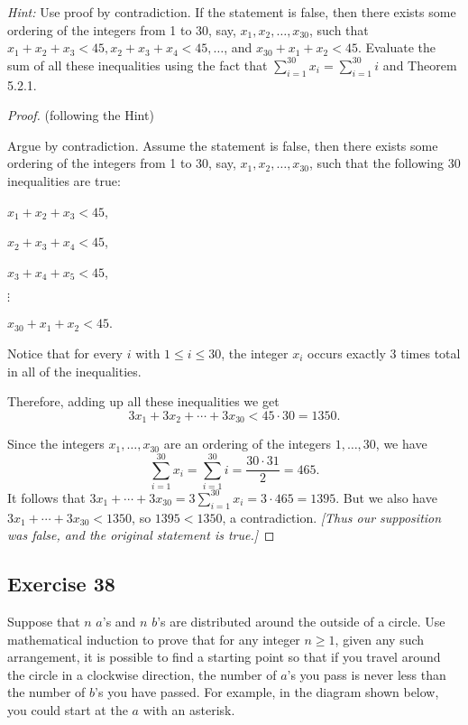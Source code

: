 \documentclass[14pt]{extarticle}
\newcommand{\dps}{\displaystyle}
\begin{document}
    {\it Hint:} Use proof by contradiction. If the statement is false, then there exists some ordering of the integers from 1 to 30, say, $x_1, x_2, \ldots, x_{30}$, such that $x_1 + x_2 + x_3 < 45, x_2 + x_3 + x_4 < 45, \ldots$, and $x_{30} + x_1 + x_2 < 45$. Evaluate the sum of all these inequalities using the fact that $\sum_{i = 1}^{30} x_i = \sum_{i = 1}^{30} i$ and Theorem 5.2.1.

\begin{proof}
    (following the Hint)

    Argue by contradiction. Assume the statement is false, then there exists some ordering of the integers from 1 to 30, say, $x_1, x_2, \ldots, x_{30}$, such that the following 30 inequalities are true:

    $x_1 + x_2 + x_3 < 45$,

    $x_2 + x_3 + x_4 < 45$,

    $x_3 + x_4 + x_5 < 45$,

    $\vdots$

    $x_{30} + x_1 + x_2 < 45$.

    Notice that for every $i$ with $1 \leq i \leq 30$, the integer $x_i$ occurs exactly 3 times total in all of the inequalities.

    Therefore, adding up all these inequalities we get
    \[
        3x_1 + 3x_2 + \cdots + 3x_{30} < 45 \cdot 30 = 1350.
    \]

    Since the integers $x_1, \ldots, x_{30}$ are an ordering of the integers $1, \ldots, 30$, we have
    \[
        \dps \sum_{i = 1}^{30} x_i = \sum_{i = 1}^{30} i = \frac{30 \cdot 31}{2} = 465.
    \]
    It follows that $\dps 3x_1 + \cdots + 3x_{30} = 3\sum_{i = 1}^{30} x_i = 3 \cdot 465 = 1395$. But we also have $3x_1 + \cdots + 3x_{30} < 1350$, so $1395 < 1350$, a contradiction. {\it [Thus our supposition was false, and the original statement is true.]}
\end{proof}

\subsection{Exercise 38}
Suppose that $n$ $a$’s and $n$ $b$’s are distributed around
the outside of a circle. Use mathematical induction to prove that for any integer $n \geq 1$, given any such arrangement, it is possible to find a starting point so that if you travel around the circle in a clockwise direction, the number of $a$’s you pass is never less than the number of $b$’s you have passed. For example, in the diagram shown below, you could start at the $a$ with an asterisk.
\end{document}
